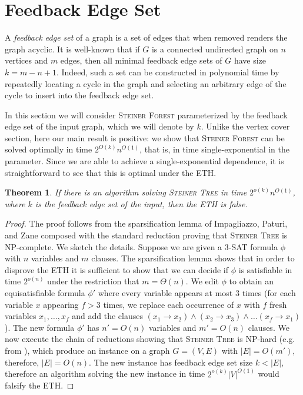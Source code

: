 \documentclass[a4paper]{article}
\theoremstyle{plain}
\newtheorem{theorem}{Theorem}%
\newcommand{\pname}[1]{\textsc{#1}}
\newcommand{\SF}{\pname{Steiner Forest}\xspace}
\newcommand{\ST}{\pname{Steiner Tree}\xspace}
\begin{document}
\section{Feedback Edge Set}

A \emph{feedback edge set} of a graph is a set of edges that when
removed renders the graph acyclic. It is well-known that if $G$ is a connected
undirected graph on $n$ vertices and $m$ edges, then all minimal feedback edge
sets of $G$ have size $k=m-n+1$. Indeed, such a set can be constructed in
polynomial time by repeatedly locating a cycle in the graph and selecting an
arbitrary edge of the cycle to insert into the feedback edge set.


In this section we will consider \SF parameterized by the feedback edge set of
the input graph, which we will denote by $k$. Unlike the vertex cover section,
here our main result is positive: we show that \SF can be solved optimally in
time $2^{O(k)}n^{O(1)}$, that is, in time single-exponential in the parameter.
Since we are able to achieve a single-exponential dependence, it is
straightforward to see that this is optimal under the ETH.

\begin{theorem}\label{thm:feseth} %
If there is an algorithm solving \ST in time
$2^{o(k)}n^{O(1)}$, where $k$ is the feedback edge set of the input, then the
ETH is false. \end{theorem}

%

\begin{proof}%
The proof follows from the sparsification lemma of Impagliazzo,
Paturi, and Zane \cite{ImpagliazzoPZ01} composed with the standard reduction
proving that \ST is NP-complete. We sketch the details. Suppose we are given a
\textsc{3-SAT} formula $\phi$ with $n$ variables and $m$ clauses. The
sparsification lemma shows that in order to disprove the ETH it is sufficient
to show that we can decide if $\phi$ is satisfiable in time $2^{o(n)}$ under
the restriction that $m=\Theta(n)$. We edit $\phi$ to obtain an equisatisfiable
formula $\phi'$ where every variable appears at most $3$ times (for each
variable $x$ appearing $f>3$ times, we replace each occurrence of $x$ with $f$
fresh variables $x_1,\ldots, x_f$ and add the clauses $(x_1\to x_2)\land
(x_2\to x_3)\land\ldots (x_f\to x_1)$). The new formula $\phi'$ has $n'=O(n)$
variables and $m'=O(n)$ clauses. We now execute the chain of reductions showing
that \ST is NP-hard (e.g. from  \cite{karp1975computational}), which produce an
instance on a graph $G=(V,E)$ with $|E|=O(m')$, therefore, $|E|=O(n)$. The new
instance has feedback edge set size $k<|E|$, therefore an algorithm solving the
new instance in time $2^{o(k)}|V|^{O(1)}$ would falsify the ETH.  \end{proof}
    
\end{document}
